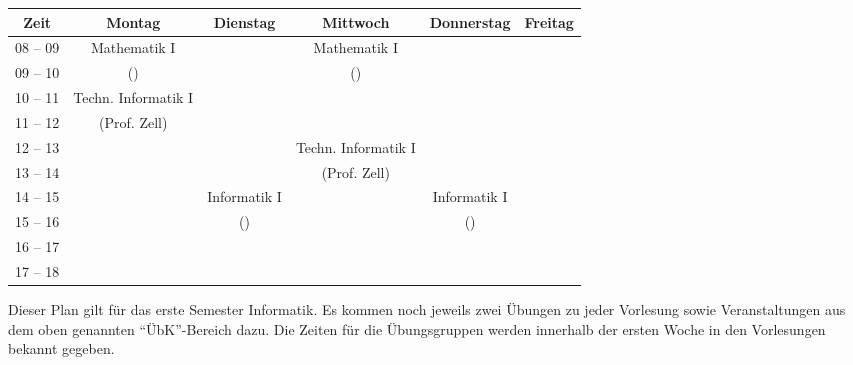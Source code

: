 \begin{minipage}{\textwidth}
    \footnotesize
\begin{center}
	\begin{tabular}{|c|c|c|c|c|c|}
	\hline
	 Zeit     &    Montag                    & Dienstag          & Mittwoch          	& Donnerstag & Freitag \\ \hline\hline
	 08 -- 09 &    Mathematik I              &                   & Mathematik I      	&  &  \\ \cline{1-1} \cline{3-3} \cline{5-6} 
	 09 -- 10 &    (\Matheprof)              &                   & (\Matheprof) 		&  &  \\ \hline
	 10 -- 11 &    Techn. Informatik I		 &                   &                   	&  &  \\ \cline{1-1} \cline{3-6}
	 11 -- 12 &    (Prof. Zell)				 &                   &                   	&  &  \\ \hline
	 12 -- 13 &                              &                   & Techn. Informatik I 	&  &  \\ \cline{1-3} \cline{5-6}
	 13 -- 14 &                              &                   & (Prof. Zell)      	&  &  \\ \hline
	 14 -- 15 &                              & Informatik I  	 &                 			&  Informatik I &  \\ \cline{1-2} \cline{4-4} \cline{6-6}
	 15 -- 16 &                              & (\Infoprof)  &                   	&  (\Infoprof) &  \\ \hline
	 16 -- 17 &                              &                   &                   	&  &  \\ \hline
	 17 -- 18 &                              &                   &                   	&  &  \\ \hline
	\end{tabular}
	
\end{center}
\end{minipage}
Dieser Plan gilt für das erste Semester Informatik. Es kommen noch jeweils zwei Übungen zu jeder Vorlesung
sowie Veranstaltungen aus dem oben genannten "`ÜbK"'-Bereich dazu.
Die Zeiten für die Übungsgruppen werden innerhalb der ersten Woche in den Vorlesungen bekannt gegeben. \\ \\ \noindent
